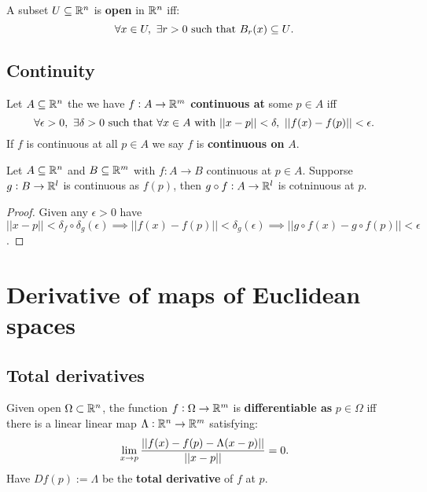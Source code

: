 \documentclass[../Year2.tex]{subfiles}
\begin{document}
\begin{definition}
    A subset $U\subseteq\mathbb{R}^n$ is \textbf{open} in $\mathbb{R}^n$ iff: \[
        \forall x\in U, \ \exists r>0 \ \black{such that } B_r(x)\subseteq U\black{.}
    \]
\end{definition}

\vspace{-40pt}

\subsection{Continuity}

\begin{definition}[Continuity]
    Let $A\subseteq \mathbb{R}^n$ the we have $f:A\rightarrow \mathbb{R}^m$ \textbf{continuous at} some $p\in A$ iff \[
        \forall\epsilon>0, \ \exists\delta>0 \ \black{such that } \forall x\in A \ \black{with } ||x-p||<\delta, \ ||f(x)-f(p)||<\epsilon\black{.} 
    \] If $f$ is continuous at all $p\in A$ we say $f$ is \textbf{continuous on} $A$.
\end{definition}

\begin{theorem}
    Let $A\subseteq\mathbb{R}^n$ and $B\subseteq\mathbb{R}^m$ with $f:A\rightarrow B$ continuous at $p\in A$. Supporse $g:B\rightarrow\mathbb{R}^l$ is continuous as $f(p)$, then $g\circ f:A\rightarrow\mathbb{R}^l$ is cotninuous at $p$.
    \begin{proof}
        Given any $\epsilon>0$ have $||x-p||<\delta_f\circ\delta_g(\epsilon)\implies||f(x)-f(p)||<\delta_g(\epsilon)\implies||g\circ f(x)-g\circ f(p)||<\epsilon$.
    \end{proof}
\end{theorem}

\section{Derivative of maps of Euclidean spaces}

\subsection{Total derivatives}

\begin{definition}
    Given open $\Omega\subset\mathbb{R}^n$, the function $f:\Omega\rightarrow \mathbb{R}^m$ is \textbf{differentiable as} $p\in\Omega$ iff there is a linear linear map $\Lambda:\mathbb{R}^n\rightarrow\mathbb{R}^m$ satisfying: \[
        \lim_{x\rightarrow p} \frac{||f(x)-f(p)-\Lambda(x-p)||}{||x-p||}=0\text{\textcolor{black}{.}}
    \] Have $Df(p):=\Lambda$ be the \textbf{total derivative} of $f$ at $p$.
\end{definition}
\end{document}
